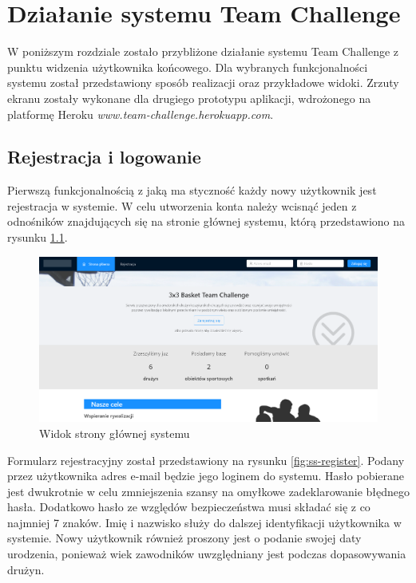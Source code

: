 
\chapter{Działanie systemu Team Challenge}

W poniższym rozdziale zostało przybliżone działanie systemu Team Challenge z punktu widzenia użytkownika końcowego. Dla wybranych funkcjonalności systemu został przedstawiony sposób realizacji oraz przykładowe widoki. Zrzuty ekranu zostały wykonane dla drugiego prototypu aplikacji, wdrożonego na platformę Heroku \textit{www.team-challenge.herokuapp.com}.   

\section{Rejestracja i logowanie}

Pierwszą funkcjonalnością z jaką ma styczność każdy nowy użytkownik jest rejestracja w systemie. W celu utworzenia konta należy wcisnąć jeden z odnośników znajdujących się na stronie głównej systemu, którą przedstawiono na rysunku \ref{fig:ss-landing}.

\begin{figure}[H]
\centering
\includegraphics[width=\linewidth]{065-dzialanie/rys/ss-landing.PNG}
\caption{Widok strony głównej systemu}
\label{fig:ss-landing}
\end{figure}

Formularz rejestracyjny został przedstawiony na rysunku \ref{fig:ss-register}. Podany przez użytkownika adres e-mail będzie jego loginem do systemu. Hasło pobierane jest dwukrotnie w celu zmniejszenia szansy na omyłkowe zadeklarowanie błędnego hasła. Dodatkowo hasło ze względów bezpieczeństwa musi składać się z co najmniej 7 znaków. Imię i nazwisko służy do dalszej identyfikacji użytkownika w systemie. Nowy użytkownik również proszony jest o podanie swojej daty urodzenia, ponieważ wiek zawodników uwzględniany jest podczas dopasowywania drużyn.


